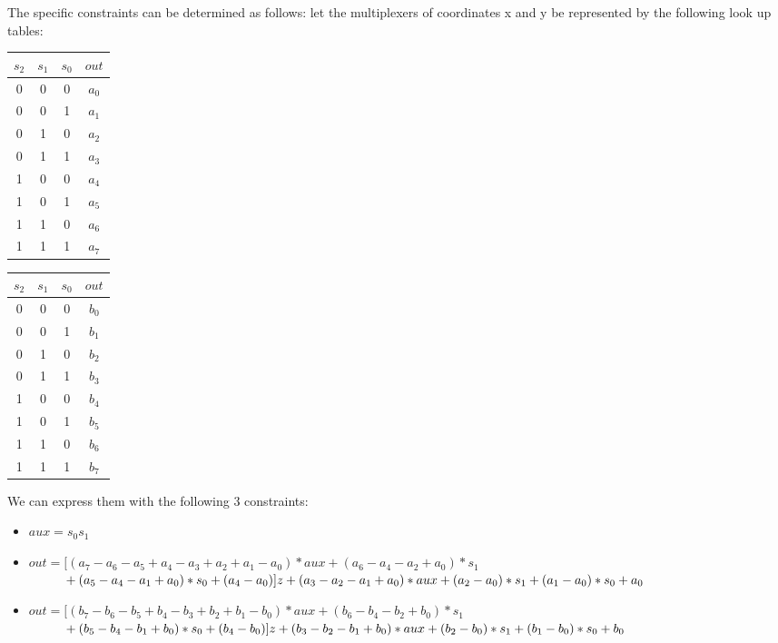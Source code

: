 The specific constraints can be determined as follows: let the multiplexers of coordinates x and y be represented by the following look up tables:
%
\begin{table}[h]
    \begin{minipage}{.5\linewidth}
      \centering
	\begin{tabular}{c|c|c|c}
                $s_2$ & $s_1$ & $s_0$ & $out$\\
                	\hline
                	0 & 0 & 0 & $a_0$\\
                	0 & 0 & 1 & $a_1$\\
                	0 & 1 & 0 & $a_2$\\
                	0 & 1 & 1 & $a_3$\\
                	1 & 0 & 0 & $a_4$\\
                	1 & 0 & 1 & $a_5$\\
                	1 & 1 & 0 & $a_6$\\
                	1 & 1 & 1 & $a_7$
      	\end{tabular}
    \end{minipage}%
    \begin{minipage}{.5\linewidth}
      \centering
	\begin{tabular}{c|c|c|c}
		$s_2$ & $s_1$ & $s_0$ & $out$\\
		\hline
		0 & 0 & 0 & $b_0$\\
		0 & 0 & 1 & $b_1$\\
		0 & 1 & 0 & $b_2$\\
		0 & 1 & 1 & $b_3$\\
		1 & 0 & 0 & $b_4$\\
		1 & 0 & 1 & $b_5$\\
		1 & 1 & 0 & $b_6$\\
		1 & 1 & 1 & $b_7$
	\end{tabular}
    \end{minipage} 
\end{table}

\noi We can express them with the following 3 constraints:
\begin{itemize}
    \item 	$aux = s_0 s_1$ %
    \item 	$out = [ (a_7-a_6-a_5+a_4-a_3+a_2+a_1-a_0)*aux 
    		+ (a_6-a_4-a_2+a_0)*s_1$ \\
    		$\text{\qquad\;\;} + (a_5-a_4-a_1+a_0)*s_0
    		+ (a_4 - a_0) ] z 
    		+ (a_3-a_2-a_1+a_0)*aux + (a_2-a_0)*s_1 + (a_1-a_0)*s_0+ a_0$
    \item	$ out = [ (b_7-b_6-b_5+b_4-b_3+b_2+b_1-b_0)*aux 
    		+ (b_6-b_4-b_2+b_0)*s_1$ \\
    		$\text{\qquad\;\;} + (b_5-b_4-b_1+b_0)*s_0 
    		+ (b_4 - b_0)] z 
    		+ (b_3-b_2-b_1+b_0)*aux + (b_2-b_0)*s_1 + (b_1-b_0)*s_0+ b_0$\\
\end{itemize}
